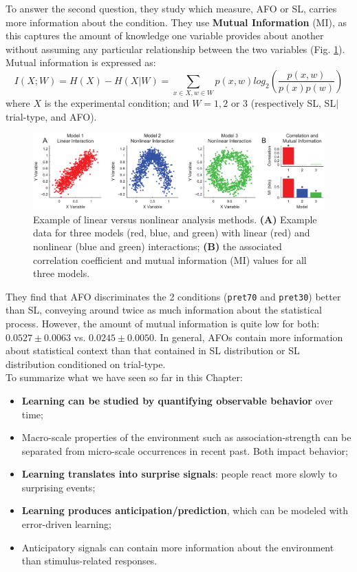 To answer the second question, they study which measure, AFO or SL, carries more information about the condition. They use \textbf{Mutual Information} (MI), as this captures the amount of knowledge one variable provides about another without assuming any particular relationship between the two variables (Fig. \ref{fig:timme}). Mutual information is expressed as:
\[
I(X;W) = H(X) - H(X|W) = \sum_{x \in X, w \in W} p(x,w) log_2 \left( \frac{p(x,w)}{p(x)p(w)} \right)
\]
where $X$ is the experimental condition; and $W=1,2\text{ or }3$ (respectively SL, SL$\vert$trial-type, and AFO).

\begin{figure}[!ht]
    \centering
    \captionsetup{width=.8\linewidth}
    \includegraphics[width=0.85\linewidth]{images/timme.png}
    \caption{Example of linear versus nonlinear analysis methods. \textbf{(A)} Example data for three models (red, blue, and green) with linear (red) and nonlinear (blue and green) interactions; \textbf{(B)} the associated correlation coefficient and mutual information (MI) values for all three models.}
    \label{fig:timme}
\end{figure}

They find that AFO discriminates the 2 conditions (\texttt{pret70} and \texttt{pret30}) better than SL, conveying around twice as much information about the statistical process.
However, the amount of mutual information is quite low for both: $0.0527 \pm 0.0063$ vs. $0.0245 \pm 0.0050$. In general, AFOs contain more information about statistical context than that contained in SL distribution or SL distribution conditioned on trial-type.\\

To summarize what we have seen so far in this Chapter:
\begin{itemize}
    \item \textbf{Learning can be studied by quantifying observable behavior} over time;
    \item Macro-scale properties of the environment such as association-strength can be separated from micro-scale occurrences in recent past. Both impact behavior;
    \item \textbf{Learning translates into surprise signals}: people react more slowly to surprising events;
    \item \textbf{Learning produces anticipation/prediction}, which can be modeled with error-driven learning;
    \item Anticipatory signals can contain more information about the environment than stimulus-related responses.
\end{itemize}

